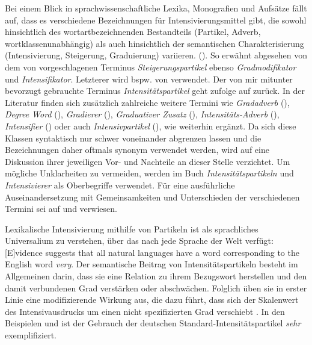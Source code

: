 Bei einem Blick in sprachwissenschaftliche Lexika, Monografien und Aufsätze fällt auf, dass es verschiedene Bezeichnungen für Intensivierungsmittel gibt, die \glqq{}sowohl hinsichtlich des wortartbezeichnenden Bestandteils (Partikel, Adverb, wortklassenunabhängig) als auch hinsichtlich der semantischen Charakterisierung (Intensivierung, Steigerung, Graduierung) variieren.\grqq{} ({\citealt[397]{Breindl.2007}}). So erwähnt \citet[650]{Bussmann.2002} abgesehen von dem von \citet[]{Altmann.1976} vorgeschlagenen Terminus \textit{Steigerungspartikel} ebenso \textit{Gradmodifikator} und \textit{Intensifikator}. Letzterer wird bspw. von \citet[]{Os.1989} verwendet. Der von mir mitunter bevorzugt gebrauchte Terminus \textit{Intensitätspartikel} geht \citet[397]{Breindl.2007} zufolge auf \citet[56]{Zifonun.1997} zurück. In der Literatur finden sich zusätzlich zahlreiche weitere Termini wie  \textit{Gradadverb} (\citealt[]{Biedermann.1969}), \textit{Degree Word} (\citealt[]{Bolinger.1972}), \textit{Gradierer} ({\citealt[150]{Rachidi.1989}}), \textit{Graduativer Zusatz} ({\citealt[254]{Polenz.1988}}), \textit{Intensitäts-Adverb} (\citealt[593]{Weinrich.1993}), \textit{Intensifier} ({\citealt[589]{Quirk.1985}}) oder auch \textit{Intensivpartikel} ({\citealt[291]{Hentschel.2013}}), wie \citet[397]{Breindl.2007} weiterhin ergänzt. Da sich diese Klassen syntaktisch nur schwer voneinander abgrenzen lassen und die Bezeichnungen daher oftmals synonym verwendet werden, wird auf eine Diskussion ihrer jeweiligen Vor- und Nachteile an dieser Stelle verzichtet. Um mögliche Unklarheiten zu vermeiden, werden im Buch \textit{Intensitätspartikeln} und \textit{Intensivierer} als Oberbegriffe verwendet. Für eine ausführliche Auseinandersetzung mit Gemeinsamkeiten und Unterschieden der verschiedenen Termini sei auf {\citet[25ff.]{Klara.2009}} und {\citet[83ff.]{Westpfahl.2020} verwiesen}.

Lexikalische Intensivierung mithilfe von Partikeln ist als sprachliches Universalium zu verstehen, über das nach \citet[67]{Wierzbicka.1996} jede Sprache der Welt verfügt: \glqq{}[E]vidence suggests that all natural languages have a word corresponding to the English word \textit{very}\grqq{}. Der semantische Beitrag von Intensitätspartikeln besteht im Allgemeinen darin, dass sie eine Relation zu ihrem Bezugswort herstellen und den damit verbundenen Grad verstärken oder abschwächen. Folglich üben sie in erster Linie eine modifizierende Wirkung aus, die dazu führt, dass sich der Skalenwert des Intensivausdrucks um einen nicht spezifizierten Grad verschiebt \citep[vgl.][987f.]{Zifonun.1997}. In den Beispielen  und  ist der Gebrauch der deutschen Standard-Intensitätspartikel \textit{sehr} exemplifiziert.
 

